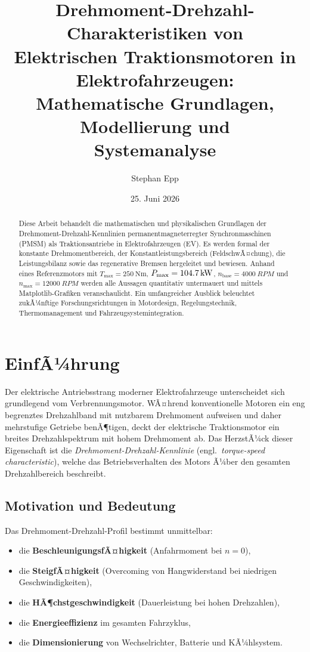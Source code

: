 ﻿\documentclass[a4paper,12pt]{article}
\title{Drehmoment-Drehzahl-Charakteristiken von\\
Elektrischen Traktionsmotoren in Elektrofahrzeugen:\\
Mathematische Grundlagen, Modellierung und\\
Systemanalyse}
\author{Stephan Epp}
\date{25. Juni 2026}
\theoremstyle{definition}
\begin{document}
\maketitle

\begin{abstract}
Diese Arbeit behandelt die mathematischen und physikalischen Grundlagen der
Drehmoment-Drehzahl-Kennlinien permanentmagneterregter Synchronmaschinen (PMSM)
als Traktionsantriebe in Elektrofahrzeugen (EV). Es werden formal der konstante
Drehmomentbereich, der Konstantleistungsbereich (FeldschwÃ¤chung), die
Leistungsbilanz sowie das regenerative Bremsen hergeleitet und bewiesen.
Anhand eines Referenzmotors mit $T_{\max} = \SI{250}{\newton\metre}$,
$P_{\max} = \SI{104{,}7}{\kilo\watt}$, $n_{\mathrm{base}} = \SI{4000}{RPM}$ und
$n_{\max} = \SI{12000}{RPM}$ werden alle Aussagen quantitativ untermauert und
mittels Matplotlib-Grafiken veranschaulicht. Ein umfangreicher Ausblick
beleuchtet zukÃ¼nftige Forschungsrichtungen in Motordesign, Regelungstechnik,
Thermomanagement und Fahrzeugsystemintegration.
\end{abstract}

\tableofcontents
\newpage

\section{EinfÃ¼hrung}

Der elektrische Antriebsstrang moderner Elektrofahrzeuge unterscheidet sich
grundlegend vom Verbrennungsmotor. WÃ¤hrend konventionelle Motoren ein eng
begrenztes Drehzahlband mit nutzbarem Drehmoment aufweisen und daher mehrstufige
Getriebe benÃ¶tigen, deckt der elektrische Traktionsmotor ein breites Drehzahlspektrum
mit hohem Drehmoment ab. Das HerzstÃ¼ck dieser Eigenschaft ist die
\emph{Drehmoment-Drehzahl-Kennlinie} (engl.\ \emph{torque-speed characteristic}),
welche das Betriebsverhalten des Motors Ã¼ber den gesamten Drehzahlbereich beschreibt.

\subsection{Motivation und Bedeutung}

Das Drehmoment-Drehzahl-Profil bestimmt unmittelbar:
\begin{itemize}
    \item die \textbf{BeschleunigungsfÃ¤higkeit} (Anfahrmoment bei $n = 0$),
    \item die \textbf{SteigfÃ¤higkeit} (Overcoming von Hangwiderstand bei niedrigen
          Geschwindigkeiten),
    \item die \textbf{HÃ¶chstgeschwindigkeit} (Dauerleistung bei hohen Drehzahlen),
    \item die \textbf{Energieeffizienz} im gesamten Fahrzyklus,
    \item die \textbf{Dimensionierung} von Wechselrichter, Batterie und KÃ¼hlsystem.
\end{itemize}
\end{document}

